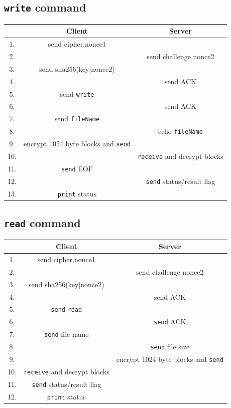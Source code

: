 \documentclass[11pt]{article}
\begin{document}
\subsection*{\texttt{write} command}
\begin{center}
\begin{tabular}{ |c|c|c| } 
 \hline
 ~& Client & Server\\
 \hline\hline
 1. & send cipher,nonce1 & ~\\
 \hline
 2. & ~& send challenge nonce2 \\
 \hline
 3. & send sha256(key|nonce2) & ~ \\
 \hline
 4. & ~& send ACK\\
 \hline
 5. & send \texttt{write} & ~ \\ 
 \hline
 6. & ~ & send ACK\\ 
 \hline
 7. & send \texttt{fileName} & ~ \\ 
 \hline
 8. & ~ & echo \texttt{fileName}\\
 \hline
 9. & encrypt 1024 byte blocks and \texttt{send} & ~\\
 \hline
 10. & ~& \texttt{receive} and decrypt blocks\\
 \hline
 11. &\texttt{send} EOF &~\\
 \hline
 12. & ~& \texttt{send} status/result flag\\
 \hline
 13. & \texttt{print} status & ~\\
 \hline
\end{tabular}
\end{center}

\subsection*{\texttt{read} command}
\begin{center}
\begin{tabular}{ |c|c|c| } 
 \hline
 ~& Client & Server\\
 \hline\hline
 1. & send cipher,nonce1 & ~\\
 \hline
 2. & ~& send challenge nonce2 \\
 \hline
 3. & send sha256(key|nonce2) & ~ \\
 \hline
 4. & ~& send ACK\\
 \hline
 5. & \texttt{send} \texttt{read} & ~ \\ 
 \hline
 6. & ~ & \texttt{send} {ACK} \\ 
 \hline
 7. & \texttt{send} file name & ~ \\ 
 \hline
 8. & ~ & \texttt{send} file size\\
 \hline
 9. & ~& encrypt 1024 byte blocks and \texttt{send}\\
 \hline
 10. & \texttt{receive} and decrypt blocks &~\\
 \hline
 11. & \texttt{send} status/result flag &~\\
 \hline
 12. & \texttt{print} status & ~\\
 \hline
\end{tabular}
\end{center}
\end{document}
